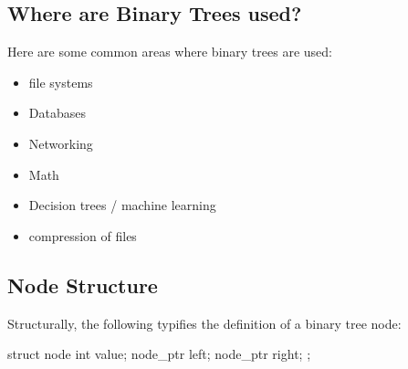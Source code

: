 \documentclass{report}
\begin{document}
\subsection{Where are Binary Trees used?}
Here are some common areas where binary trees are used:
\begin{itemize}
  \item file systems
  \item Databases
  \item Networking
  \item Math
  \item Decision trees / machine learning
  \item compression of files
\end{itemize}
\subsection{Node Structure}
Structurally, the following typifies the definition of a binary tree node:
\begin{cppcode}
struct node {
  int value;
  node_ptr left;
  node_ptr right;
};
\end{cppcode}
\newpage
\end{document}

